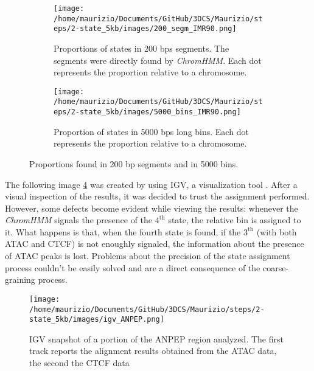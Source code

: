\begin{figure}[H]
  \centering
  \begin{subfigure}[t]{0.45\textwidth}
    \texttt{[image: /home/maurizio/Documents/GitHub/3DCS/Maurizio/steps/2-state\_5kb/images/200\_segm\_IMR90.png]}
    \caption{Proportions of states in 200 bps segments. The segments were directly found by \textit{ChromHMM}. Each dot represents the proportion relative to a chromosome.}
    \label{fig: proportions in segments}
  \end{subfigure}
  \begin{subfigure}[t]{0.45\textwidth}
      \texttt{[image: /home/maurizio/Documents/GitHub/3DCS/Maurizio/steps/2-state\_5kb/images/5000\_bins\_IMR90.png]}
      \caption{Proportion of states in 5000 bps long bins. Each dot represents the proportion relative to a chromosome.}
      \label{fig: proportions in bins}
  \end{subfigure}
  \caption{Proportions found in 200 bp segments and in 5000 bins.}
  \label{fig: proportions bins and steps}
\end{figure}


The following image \ref{fig: ANPEP igv} was created by using IGV, a visualization tool
\cite{robinsonIgvJsEmbeddable2020a,robinsonIntroductionIntegrativeGenomics}
. After a visual inspection of the results, it was decided to trust the assignment performed. However, some defects become evident while viewing the results: whenever the \textit{ChromHMM} signals the presence of the $4^{\text{th}}$ state, the relative bin is assigned to it. What happens is that, when the fourth state is found, if the $3^{\text{th}}$ (with both ATAC and CTCF) is not enoughly signaled, the information about the presence of ATAC peaks is lost. Problems about the precision of the state assignment process couldn't be easily solved and are a direct consequence of the coarse-graining process.

\begin{figure}[H]
  \centering
  \texttt{[image: /home/maurizio/Documents/GitHub/3DCS/Maurizio/steps/2-state\_5kb/images/igv\_ANPEP.png]}
  \caption{IGV snapshot of a portion of the ANPEP region analyzed. The first track reports the alignment results obtained from the ATAC data, the second the CTCF data}
  \label{fig: ANPEP igv}
\end{figure}
